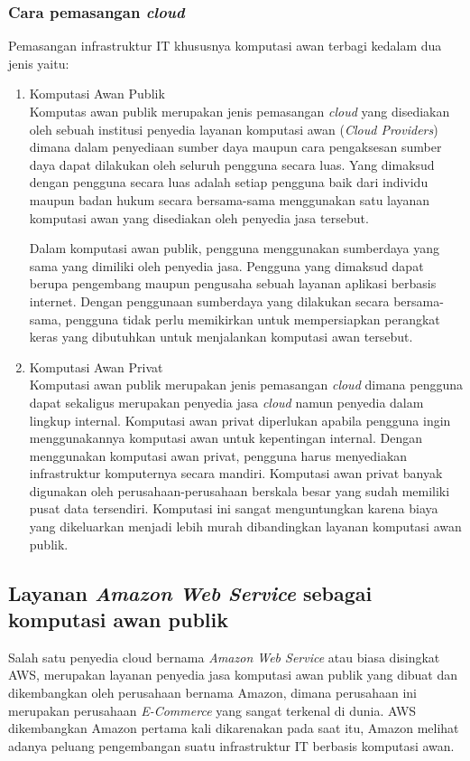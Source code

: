\documentclass[pi.tex]{subfile}
\begin{document}
\subsubsection{Cara pemasangan \emph{cloud}}\hspace{10pt}
Pemasangan infrastruktur IT khususnya komputasi awan terbagi kedalam dua jenis yaitu:

\begin{enumerate}[leftmargin=1.65cm]
\item Komputasi Awan Publik\\
  Komputas awan publik merupakan jenis pemasangan \emph{cloud} yang disediakan oleh sebuah institusi penyedia layanan komputasi awan (\emph{Cloud Providers}) dimana dalam penyediaan sumber daya maupun cara pengaksesan sumber daya dapat dilakukan oleh seluruh pengguna secara luas. Yang dimaksud dengan pengguna secara luas adalah setiap pengguna baik dari individu maupun badan hukum secara bersama-sama menggunakan satu layanan komputasi awan yang disediakan oleh penyedia jasa tersebut.

  Dalam komputasi awan publik, pengguna menggunakan sumberdaya yang sama yang dimiliki oleh penyedia jasa. Pengguna yang dimaksud dapat berupa pengembang maupun pengusaha sebuah layanan aplikasi berbasis internet. Dengan penggunaan sumberdaya yang dilakukan secara bersama-sama, pengguna tidak perlu memikirkan untuk mempersiapkan perangkat keras yang dibutuhkan untuk menjalankan komputasi awan tersebut.
  
\item Komputasi Awan Privat\\
  Komputasi awan publik merupakan jenis pemasangan \emph{cloud} dimana pengguna dapat sekaligus merupakan penyedia jasa \emph{cloud} namun penyedia dalam lingkup internal. Komputasi awan privat diperlukan apabila pengguna ingin menggunakannya komputasi awan untuk kepentingan internal. Dengan menggunakan komputasi awan privat, pengguna harus menyediakan infrastruktur komputernya secara mandiri.
  Komputasi awan privat banyak digunakan oleh perusahaan-perusahaan berskala besar yang sudah memiliki pusat data tersendiri. Komputasi ini sangat menguntungkan karena biaya yang dikeluarkan menjadi lebih murah dibandingkan layanan komputasi awan publik.
\end{enumerate}
\subsection{Layanan \emph{Amazon Web Service} sebagai komputasi awan publik }\hspace{5pt}
Salah satu penyedia cloud bernama \emph{Amazon Web Service} atau biasa disingkat AWS, merupakan layanan penyedia jasa komputasi awan publik yang dibuat dan dikembangkan oleh perusahaan bernama Amazon, dimana perusahaan ini merupakan perusahaan \emph{E-Commerce} yang sangat terkenal di dunia. AWS dikembangkan Amazon pertama kali dikarenakan pada saat itu, Amazon melihat adanya peluang pengembangan suatu infrastruktur IT berbasis komputasi awan.
\end{document}
